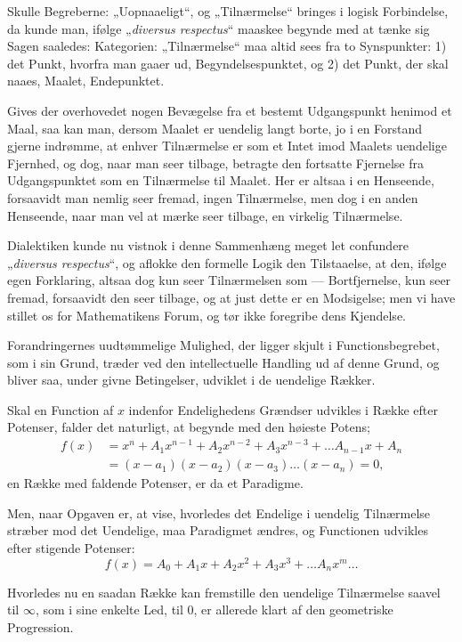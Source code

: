 \documentclass[12pt]{book}
\newcommand{\opage}[1]{\marginnote{\footnotesize\textit{[#1]}}}
\begin{document}
Skulle Begreberne: „Uopnaaeligt“, og „Tilnærmelse“ bringes i logisk Forbindelse,
da kunde man, ifølge „\textit{diversus respectus}“ maaskee begynde med at tænke
sig Sagen saaledes: Kategorien: „Tilnærmelse“ maa altid sees fra to Synspunkter:
1) det Punkt, hvorfra man gaaer ud, Begyndelsespunktet, og 2) det Punkt, der skal
naaes, Maalet, Endepunktet.

Gives der overhovedet nogen Bevægelse fra et bestemt Udgangspunkt henimod et
Maal, saa kan man, dersom Maalet er uendelig langt borte, jo i en Forstand gjerne
indrømme, at enhver Tilnærmelse er som et Intet imod Maalets uendelige Fjernhed,
og dog, naar man seer tilbage, betragte den fortsatte Fjernelse fra
Udgangspunktet som en Tilnærmelse til Maalet. Her er altsaa i en Henseende,
forsaavidt man nemlig seer fremad, ingen Tilnærmelse, men dog i en anden
Henseende, naar man vel at mærke seer tilbage, en virkelig Tilnærmelse.

Dialektiken kunde nu vistnok i denne Sammenhæng meget let confundere
„\textit{diversus respectus}“, og aflokke den
\opage{27} formelle Logik den Tilstaaelse, at den, ifølge egen Forklaring, altsaa dog kun
seer Tilnærmelsen som --- Bortfjernelse, kun seer fremad, forsaavidt den seer
tilbage, og at just dette er en Modsigelse; men vi have stillet os for
Mathematikens Forum, og tør ikke foregribe dens Kjendelse.

Forandringernes uudtømmelige Mulighed, der ligger skjult i Functionsbegrebet, som
i sin Grund, træder ved den intellectuelle Handling ud af denne Grund, og bliver
saa, under givne Betingelser, udviklet i de uendelige Rækker.

Skal en Function af $x$ indenfor Endelighedens Grændser udvikles i Række efter
Potenser, falder det naturligt, at begynde med den høieste Potens;
\[
\begin{aligned}
f(x) &= x^{n} + A_1 x^{n-1} + A_2 x^{n-2} + A_3 x^{n-3} + \dots A_{n-1}x + A_n\\
&= (x-a_1)(x-a_2)(x-a_3)\dots(x-a_n) = 0,
\end{aligned}
\]
en Række med faldende Potenser, er da et Paradigme.

Men, naar Opgaven er, at vise, hvorledes det Endelige i uendelig Tilnærmelse
stræber mod det Uendelige, maa Paradigmet ændres, og Functionen udvikles efter
stigende Potenser:
\[
f(x) = A_0 + A_1 x + A_2 x^{2} + A_3 x^{3} + \dots A_n x^{m} \dots
\]

Hvorledes nu en saadan Række kan fremstille den uendelige Tilnærmelse saavel til
$\infty$, som i sine enkelte Led, til $0$, er allerede klart af den geometriske
Progression.
\end{document}
